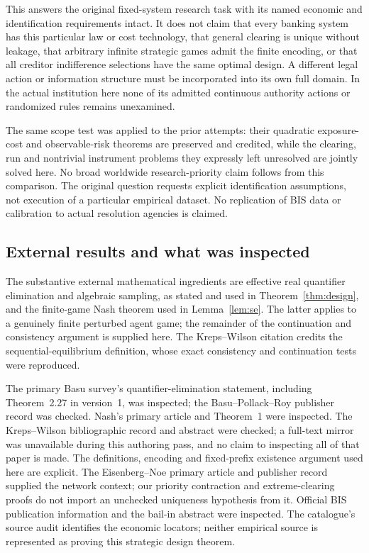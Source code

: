 \documentclass[11pt,a4paper]{article}
\numberwithin{equation}{section}
\theoremstyle{definition}
\begin{document}
This answers the original fixed-system research task with its named
economic and identification requirements intact. It does not claim that
every banking system has this particular law or cost technology, that
general clearing is unique without leakage, that arbitrary infinite
strategic games admit the finite encoding, or that all creditor
indifference selections have the same optimal design. A different legal
action or information structure must be incorporated into its own full
domain. In the actual institution here none of its admitted continuous
authority actions or randomized rules remains unexamined.

The same scope test was applied to the prior attempts:
their quadratic exposure-cost and observable-risk theorems are preserved
and credited, while the clearing, run and nontrivial instrument problems
they expressly left unresolved are jointly solved here.
No broad worldwide research-priority claim follows from this comparison.
The original question requests explicit identification assumptions, not
execution of a particular empirical dataset. No replication of BIS data
or calibration to actual resolution agencies is claimed.

\subsection{External results and what was inspected}
The substantive external mathematical ingredients are effective real
quantifier elimination and algebraic sampling, as stated and used in
Theorem~\ref{thm:design}, and the finite-game Nash theorem used in
Lemma~\ref{lem:se}. The latter applies to a genuinely finite
perturbed agent game; the remainder of the continuation and consistency
argument is supplied here. The Kreps--Wilson citation credits the
sequential-equilibrium definition, whose exact consistency and
continuation tests were reproduced.

The primary Basu survey's quantifier-elimination statement, including
Theorem~2.27 in version~1, was inspected; the Basu--Pollack--Roy publisher
record was checked. Nash's primary article and Theorem~1 were inspected.
The Kreps--Wilson bibliographic record and abstract were checked; a
full-text mirror was unavailable during this authoring pass, and no
claim to inspecting all of that paper is made. The definitions,
encoding and fixed-prefix existence argument used here are explicit.
The Eisenberg--Noe primary article and publisher record supplied the
network context; our priority contraction and extreme-clearing proofs
do not import an unchecked uniqueness hypothesis from it.
Official BIS publication information and the bail-in abstract were
inspected. The catalogue's source audit identifies the economic
locators; neither empirical source is represented as proving this
strategic design theorem.
\end{document}
